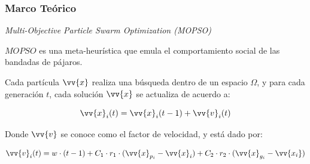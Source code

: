 \documentclass[usenames,dvipsnames]{beamer}
\begin{document}
\begin{frame}
\frametitle{Marco Teórico} 
\begin{exampleblock}{\textit{Multi-Objective Particle Swarm Optimization (MOPSO)}}

$MOPSO$ es una meta-heurística que emula el comportamiento social de las bandadas de pájaros.

Cada partícula $\vv{x}$ realiza una búsqueda dentro de un espacio $\Omega$, y para cada generación $t$, cada solución $\vv{x}$ se actualiza de acuerdo a:

\begin{equation}\label{eq:posicion1}
\vv{x}_i(t) = \vv{x}_i(t-1) + \vv{v}_i(t)
\end{equation}

Donde $\vv{v}$ se conoce como el factor de velocidad, y está dado por:

\begin{equation}\label{eq:velocidad1}
\vv{v}_i(t) = w \cdot (t-1) + C_1 \cdot r_1 \cdot (\vv{x}_{p_i} - \vv{x}_i) + C_2 \cdot r_2 \cdot (\vv{x}_{g_i} - \vv{x_i})
\end{equation}

\end{exampleblock}


\end{frame}
\end{document}
